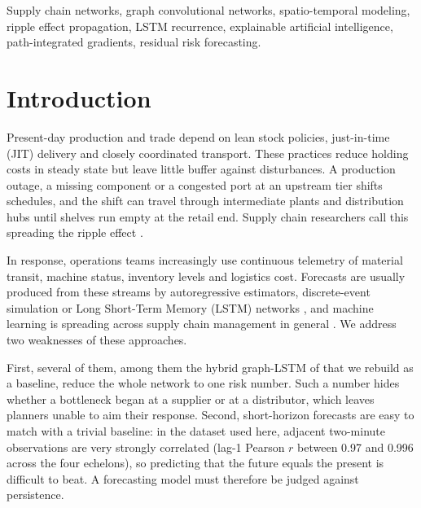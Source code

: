 \documentclass[conference]{IEEEtran}
\begin{document}
\begin{IEEEkeywords}
Supply chain networks, graph convolutional networks, spatio-temporal modeling, ripple effect propagation, LSTM recurrence, explainable artificial intelligence, path-integrated gradients, residual risk forecasting.
\end{IEEEkeywords}

\section{Introduction}
Present-day production and trade depend on lean stock policies, just-in-time (JIT) delivery and closely coordinated transport. These practices reduce holding costs in steady state but leave little buffer against disturbances. A production outage, a missing component or a congested port at an upstream tier shifts schedules, and the shift can travel through intermediate plants and distribution hubs until shelves run empty at the retail end. Supply chain researchers call this spreading the ripple effect \cite{r1,r7}.

In response, operations teams increasingly use continuous telemetry of material transit, machine status, inventory levels and logistics cost. Forecasts are usually produced from these streams by autoregressive estimators, discrete-event simulation or Long Short-Term Memory (LSTM) networks \cite{r4}, and machine learning is spreading across supply chain management in general \cite{r12}. We address two weaknesses of these approaches.

First, several of them, among them the hybrid graph-LSTM of \cite{r10} that we rebuild as a baseline, reduce the whole network to one risk number. Such a number hides whether a bottleneck began at a supplier or at a distributor, which leaves planners unable to aim their response. Second, short-horizon forecasts are easy to match with a trivial baseline: in the dataset used here, adjacent two-minute observations are very strongly correlated (lag-1 Pearson $r$ between 0.97 and 0.996 across the four echelons), so predicting that the future equals the present is difficult to beat. A forecasting model must therefore be judged against persistence.
\end{document}
